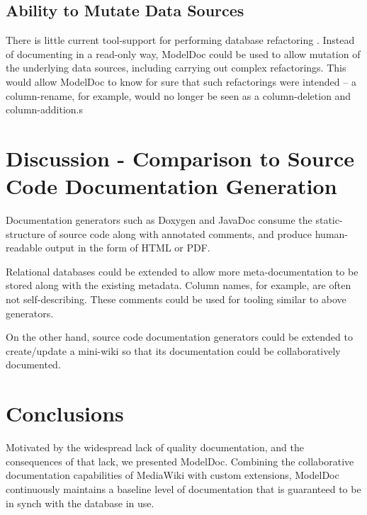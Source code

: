 \documentclass{acm_proc_article-sp}
\begin{document}
\subsection{Ability to Mutate Data Sources}

There is little current tool-support for performing database refactoring
\cite{ambler:refactoring}.  Instead of documenting in a read-only way, ModelDoc
could be used to allow mutation of the underlying data sources, including carrying out complex refactorings.  This would allow ModelDoc to know for sure that such
refactorings were intended -- a column-rename, for example, would no longer be
seen as a column-deletion and column-addition.s

\section{Discussion - Comparison to Source Code Documentation Generation}

Documentation generators such as Doxygen \cite{web:doxygen} and JavaDoc
\cite{web:javadoc} consume the static-structure of source code along with
annotated comments, and produce human-readable output in the form of HTML or
PDF.

Relational databases could be extended to allow more meta-documentation to be
stored along with the existing metadata.  Column names, for example, are often
not self-describing.  These comments could be used for tooling similar to above
generators.

On the other hand, source code documentation generators could be extended to
create/update a mini-wiki so that its documentation could be collaboratively
documented.

\section{Conclusions}
Motivated by the widespread lack of quality documentation, and the consequences
of that lack, we presented ModelDoc.  Combining the collaborative documentation
capabilities of MediaWiki with custom extensions, ModelDoc continuously
maintains a baseline level of documentation that is guaranteed to be in synch
with the database in use.



\balancecolumns
\end{document}

